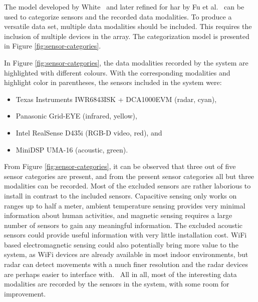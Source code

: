 The model developed by White~\cite{white87} and later refined for \gls{har} by Fu et al.~\cite{sensing-survey} 
can be used to categorize sensors and the recorded data modalities.
To produce a versatile data set, 
multiple data modalities should be included.
This requires the inclusion of multiple devices in the array.
The categorization model is presented in Figure \ref{fig:sensor-categories}.

In Figure \ref{fig:sensor-categories}, the data modalities recorded by the system are highlighted with different colours.
With the corresponding modalities and highlight color in parentheses, the sensors included in the system were:
\begin{itemize}
    \item Texas Instruments IWR6843ISK + DCA1000EVM (radar, cyan),
    \item Panasonic Grid-EYE (infrared, yellow),
    \item Intel RealSense D435i (RGB-D video, red), and
    \item MiniDSP UMA-16 (acoustic, green).
\end{itemize}

From Figure \ref{fig:sensor-categories}, it can be observed that three out of five sensor categories are present,
and from the present sensor categories all but three modalities can be recorded.
Most of the excluded sensors are rather laborious to install in contrast to the included sensors.
Capacitive sensing only works on ranges up to half a meter,
ambient temperature sensing provides very minimal information about human activities,
and magnetic sensing requires a large number of sensors to gain any meaningful information.
The excluded acoustic sensors could provide useful information with very little installation cost.
WiFi based electromagnetic sensing could also potentially bring more value to the system,
as WiFi devices are already available in most indoor environments,
but radar can detect movements with a much finer resolution and the radar devices are perhaps easier to interface with.~\cite{sensing-survey}
All in all, most of the interesting data modalities are recorded by the sensors in the system,
with some room for improvement.

